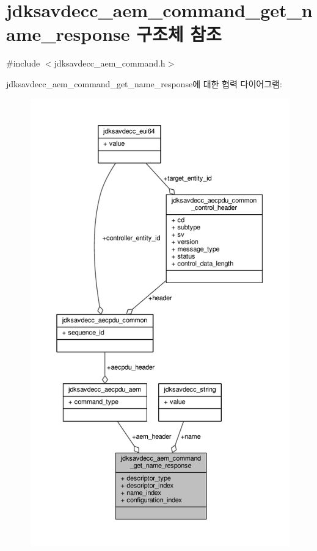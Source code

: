 \hypertarget{structjdksavdecc__aem__command__get__name__response}{}\section{jdksavdecc\+\_\+aem\+\_\+command\+\_\+get\+\_\+name\+\_\+response 구조체 참조}
\label{structjdksavdecc__aem__command__get__name__response}


{\ttfamily \#include $<$jdksavdecc\+\_\+aem\+\_\+command.\+h$>$}



jdksavdecc\+\_\+aem\+\_\+command\+\_\+get\+\_\+name\+\_\+response에 대한 협력 다이어그램\+:
\nopagebreak
\begin{figure}[H]
\begin{center}
\leavevmode
\includegraphics[height=550pt]{structjdksavdecc__aem__command__get__name__response__coll__graph}
\end{center}
\end{figure}
